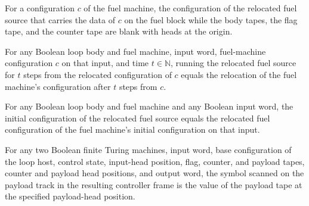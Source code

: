 \begin{definition}
\label{Turing.FinTM.loopFuelCfg}
\leanok
{}
For a configuration $c$ of the fuel machine, the configuration of the relocated fuel
source that carries the data of $c$ on the fuel block while the body tapes, the flag
tape, and the counter tape are blank with heads at the origin.
\end{definition}

\begin{lemma}
\label{Turing.FinTM.loopFuel_run}
\leanok
{}
For any Boolean loop body and fuel machine, input word, fuel-machine configuration $c$
on that input, and time $t\in\mathbb{N}$, running the relocated fuel source for $t$
steps from the relocated configuration of $c$ equals the relocation of the fuel
machine's configuration after $t$ steps from $c$.
\end{lemma}

\begin{lemma}
\label{Turing.FinTM.loopFuel_init}
\leanok
{}
For any Boolean loop body and fuel machine and any Boolean input word, the initial
configuration of the relocated fuel source equals the relocated fuel configuration of
the fuel machine's initial configuration on that input.
\end{lemma}

\begin{lemma}
\label{Turing.FinTM.loopFrame_payload}
\leanok
{}
For any two Boolean finite Turing machines, input word, base configuration of the loop
host, control state, input-head position, flag, counter, and payload tapes, counter and
payload head positions, and output word, the symbol scanned on the payload track in the
resulting controller frame is the value of the payload tape at the specified
payload-head position.
\end{lemma}

